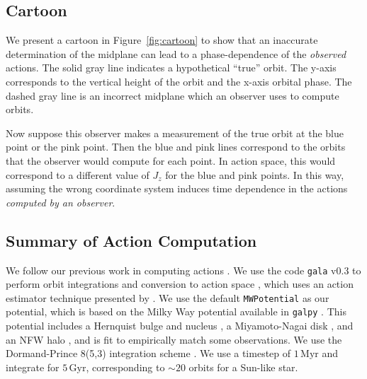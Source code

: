 \documentclass[twocolumn]{aastex62}
\newcommand{\Myr}{\text{Myr}}
\newcommand{\Gyr}{\text{Gyr}}
\begin{document}
\subsection{Cartoon} \label{ssec:cartoon}
We present a cartoon in Figure~\ref{fig:cartoon} to show that an inaccurate
determination of the midplane can lead to a phase-dependence of the {\em
observed} actions. The solid gray line indicates a hypothetical ``true''
orbit. The y-axis corresponds to the vertical height of the orbit and the
x-axis orbital phase. The dashed gray line is an incorrect midplane which an
observer uses to compute orbits.

Now suppose this observer makes a measurement of the true orbit at the blue
point or the pink point. Then the blue and pink lines correspond to the orbits
that the observer would compute for each point. In action space, this would
correspond to a different value of $J_z$ for the blue and pink points. In this
way, assuming the wrong coordinate system induces time dependence in the
actions {\em computed by an observer}.

\begin{figure*}
\caption{Cartoon showing the effect an incorrect midplane can have on orbit
integrations and as an extension on action computations. The x-axis shows the
orbital phase and the y-axis the vertical height. The top gray curve depicts a
hypothetical true orbit oscillating about the true midplane, the horizontal
solid gray line. Consider an immortal observer who erroneously assumes the
midplane is located at the horizontal dashed line. Suppose this immortal
observer measures the orbit at the blue and pink points. If the immortal
observer were to perform orbit integrations at each observation, they would
assume the blue and pink curves for the respective orbits. In this way, an
incorrect midplane will induce phase-dependence in the {\em observed}
actions.}
\label{fig:cartoon}
\end{figure*}

\subsection{Summary of Action Computation} \label{ssec:action_comp}
We follow our previous work in computing actions \citep{2018ApJ...867...31B}.
We use the code \texttt{gala} v0.3 to perform orbit integrations and
conversion to action space \citep{2017JOSS....2..388P,Price-Whelan:2018},
which uses an action estimator technique presented by
\citet{2014MNRAS.441.3284S}. We use the default \texttt{MWPotential} as our
potential, which is based on the Milky Way potential available in
\texttt{galpy} \citep{2015ApJS..216...29B}. This potential includes a
Hernquist bulge and nucleus \citep{1990ApJ...356..359H}, a Miyamoto-Nagai disk
\citep{1975PASJ...27..533M}, and an NFW halo \citep{1997ApJ...490..493N}, and
is fit to empirically match some observations. We use the Dormand-Prince
8(5,3) integration scheme \citep{Dormand80:integrator}. We use a timestep of
$1\,\Myr$ and integrate for $5\,\Gyr$, corresponding to $\sim 20$ orbits for a
Sun-like star.
\end{document}
